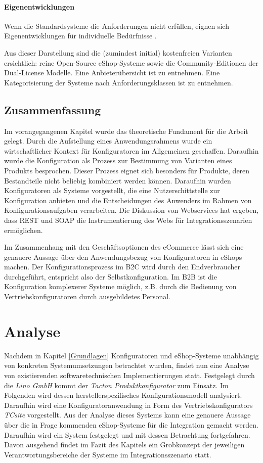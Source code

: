 \documentclass[11pt, a4paper, titlepage, listof=totoc, bibliography=totoc, index=totoc, twoside, openright, headings=normal]{scrreprt}
\begin{document}
\subsubsection*{Eigenentwicklungen}
Wenn die Standardsysteme die Anforderungen nicht erfüllen, eignen sich Eigenentwicklungen für individuelle Bedürfnisse \citep{stahl15, graf14}.

Aus dieser Darstellung sind die (zumindest initial) kostenfreien Varianten ersichtlich: reine Open-Source eShop-Systeme sowie die Community-Editionen der Dual-License Modelle. Eine Anbieterübersicht ist \citet{t3n14} zu entnehmen. Eine Kategorisierung der Systeme nach Anforderungsklassen ist \citet{graf14} zu entnehmen.

\section*{Zusammenfassung}
Im vorangegangenen Kapitel wurde das theoretische Fundament für die Arbeit gelegt. Durch die Aufstellung eines Anwendungsrahmens wurde ein wirtschaftlicher Kontext für Konfiguratoren im Allgemeinen geschaffen. Daraufhin wurde die Konfiguration als Prozess zur Bestimmung von Varianten eines Produkts besprochen. Dieser Prozess eignet sich besonders für Produkte, deren Bestandteile nicht beliebig kombiniert werden können. Daraufhin wurden Konfiguratoren als Systeme vorgestellt, die eine Nutzerschittstelle zur Konfiguration anbieten und die Entscheidungen des Anwenders im Rahmen von Konfigurationsaufgaben verarbeiten. Die Diskussion von Webservices hat ergeben, dass REST und SOAP die Instrumentierung des Webs für Integrationsszenarien ermöglichen.

Im Zusammenhang mit den Geschäftsoptionen des eCommerce lässt sich eine genauere Aussage über den Anwendungsbezug von Konfiguratoren in eShops machen. Der Konfigurationsprozess im B2C wird durch den Endverbraucher durchgeführt, entspricht also der Selbstkonfiguration. Im B2B ist die Konfiguration komplexerer Systeme möglich, z.B. durch die Bedienung von Vertriebskonfiguratoren durch ausgebildetes Personal. 

\chapter{Analyse}
\label{section:Analyse}

Nachdem in Kapitel \ref{Grundlagen} Konfiguratoren und eShop-Systeme unabhängig von konkreten Systemumsetzungen betrachtet wurden, findet nun eine Analyse von existierenden softwaretechnischen Implementierungen statt. Festgelegt durch die \emph{Lino GmbH} kommt der \emph{Tacton Produktkonfigurator} zum Einsatz. Im Folgenden wird dessen herstellerspezifisches Konfigurationsmodell analysiert. Daraufhin wird eine Konfiguratoranwendung in Form des Vertriebskonfigurators \emph{TCsite} vorgestellt. Aus der Analyse dieses Systems kann eine genauere Aussage über die in Frage kommenden eShop-Systeme für die Integration gemacht werden. Daraufhin wird ein System festgelegt und mit dessen Betrachtung fortgefahren. Davon ausgehend findet im Fazit des Kapitels ein Grobkonzept der jeweiligen Verantwortungsbereiche der Systeme im Integrationsszenario statt.
\end{document}
